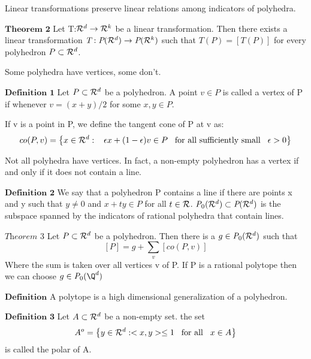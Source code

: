 \begin{description}
Linear transformations preserve linear relations among indicators of polyhedra.

$\textbf{Theorem 2}$ Let T:$\mathcal{R}^d\rightarrow\mathcal{R}^k$ be a linear transformation. Then there exists a linear transformation $\textit{T}:\textit{P}(\mathcal{R}^d)\rightarrow\textit{P}(\mathcal{R}^k)$ such that $\textit{T}(P)=[T(P)]$ for every polyhedron $P\subset\mathcal{R}^d$.

Some polyhedra have vertices, some don't.

$\textbf{Definition 1}$ Let $P\subset\mathcal{R}^d$ be a polyhedron. A point $v\in P$ is called a vertex of P if whenever $v=(x+y)/2$ for some $x,y\in P$.

If v is a point in P, we define the tangent cone of P at v as:
$$co(P,v)=\left\lbrace x\in\mathcal{R}^d:\hspace{3mm} \epsilon x+(1-\epsilon)v\in P \hspace{3mm}\text{for all sufficiently small} \hspace{3mm}\epsilon>0\right\rbrace$$

Not all polyhedra have vertices. In fact, a non-empty polyhedron has a vertex if and only if it does not contain a line.

$\textbf{Definition 2}$ We say that a polyhedron P contains a line if there are points x and y such that $y\neq 0$ and $x+ty\in P$ for all $t\in\mathcal{R}$. $\textit{P}_0(\mathcal{R}^d)\subset\textit{P}(\mathcal{R}^d)$ is the subspace spanned by the indicators of rational polyhedra that contain lines.

$\textit{Theorem 3}$ Let $P\subset\mathcal{R}^d$ be a polyhedron. Then there is a $g\in\textit{P}_0(\mathcal{R}^d)$ such that 
$$[P]=g+\sum_v[co(P,v)]$$
Where the sum is taken over all vertices v of P. If P is a rational polytope then we can choose $g\in\textit{P}_0(\Q^d)$

$\textbf{Definition}$ A polytope is a high dimensional generalization of a polyhedron.

$\textbf{Definition 3}$ Let $A\subset\mathcal{R}^d$ be a non-empty set. the set
$$A^o=\left\lbrace y\in\mathcal{R}^d:<x,y>\leq 1 \hspace{3mm}\text{for all}\hspace{3mm}x\in A\right\rbrace$$
is called the polar of A.          
\end{description}
